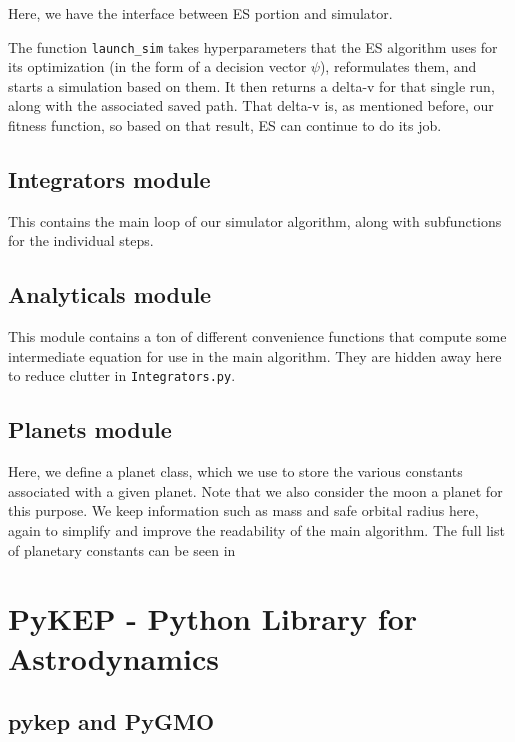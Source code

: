 Here, we have the interface between ES portion and simulator.

\noindent The function \texttt{launch\_sim} takes hyperparameters that the ES algorithm uses for its optimization (in the form of a decision vector \(\psi\)), reformulates them, and starts a simulation based on them. It then returns a delta-v for that single run, along with the associated saved path. That delta-v is, as mentioned before, our fitness function, so based on that result, ES can continue to do its job.

\subsection{Integrators module}

This contains the main loop of our simulator algorithm, along with subfunctions for the individual steps.

\subsection{Analyticals module}

This module contains a ton of different convenience functions that compute some intermediate equation for use in the main algorithm. They are hidden away here to reduce clutter in \texttt{Integrators.py}.

\subsection{Planets module}

Here, we define a planet class, which we use to store the various constants associated with a given planet. Note that we also consider the moon a planet for this purpose. We keep information such as mass and safe orbital radius here, again to simplify and improve the readability of the main algorithm. The full list of planetary constants can be seen in 

\section{PyKEP - Python Library for Astrodynamics}

\subsection{pykep and PyGMO}

